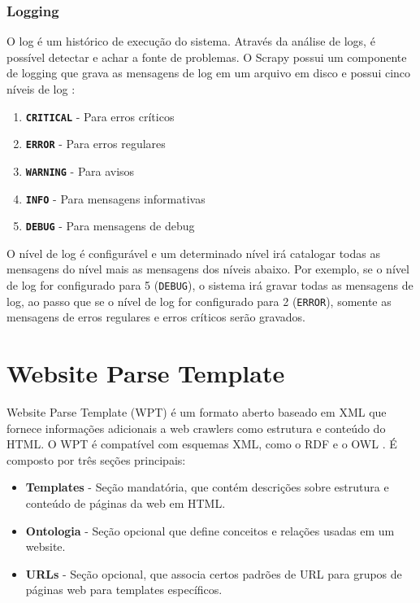 \subsubsection{Logging}

O log é um histórico de execução do sistema. Através da análise de logs, é possível detectar e achar a fonte de problemas. O Scrapy possui um componente de logging que grava as mensagens de log em um arquivo em disco e possui cinco níveis de log \cite{scrapy_log}:

\begin{enumerate}
	\item \texttt{\textbf{CRITICAL}} - Para erros críticos
	\item \texttt{\textbf{ERROR}} - Para erros regulares
	\item \texttt{\textbf{WARNING}} - Para avisos
	\item \texttt{\textbf{INFO}} - Para mensagens informativas
	\item \texttt{\textbf{DEBUG}} - Para mensagens de debug
\end{enumerate}

O nível de log é configurável e um determinado nível irá catalogar todas as mensagens do nível mais as mensagens dos níveis abaixo. Por exemplo, se o nível de log for configurado para 5 (\texttt{DEBUG}), o sistema irá gravar todas as mensagens de log, ao passo que se o nível de log for configurado para 2 (\texttt{ERROR}), somente as mensagens de erros regulares e erros críticos serão gravados.



\pagebreak
\section{Website Parse Template}


Website Parse Template (WPT) é um formato aberto baseado em XML que fornece informações adicionais a web crawlers como estrutura e conteúdo do HTML. O WPT é compatível com esquemas XML, como o RDF e o OWL \cite{wpt}. É composto por três seções principais:

\begin{itemize}
	\item \textbf{Templates} - Seção mandatória, que contém descrições sobre estrutura e conteúdo de páginas da web em HTML.
	\item \textbf{Ontologia} - Seção opcional que define conceitos e relações usadas em um website.
	\item \textbf{URLs} - Seção opcional, que associa certos padrões de URL para grupos de páginas web para templates específicos. 
\end{itemize}

